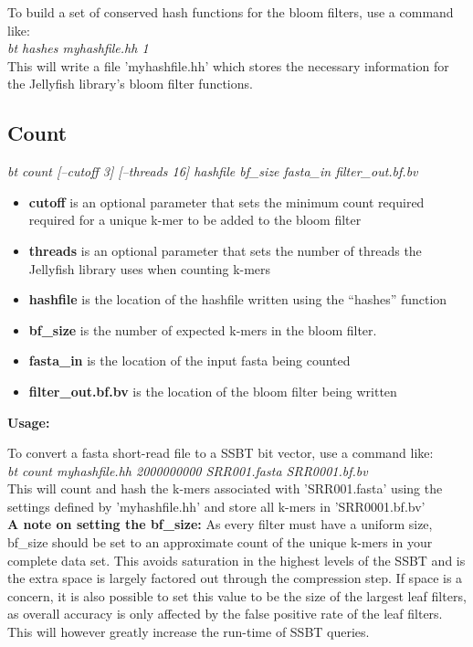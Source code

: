 \documentclass{article}
\begin{document}
To build a set of conserved hash functions for the bloom filters, use a command like: \\

\textit{bt hashes myhashfile.hh 1} \\

This will write a file 'myhashfile.hh' which stores the necessary information for the Jellyfish library's bloom filter functions.

\subsection{Count}
\textit{bt count [--cutoff 3] [--threads 16] hashfile bf\_size fasta\_in filter\_out.bf.bv}
\begin{itemize}
\item \textbf{cutoff} is an optional parameter that sets the minimum count required required for a unique k-mer to be added to the bloom filter
\item \textbf{threads} is an optional parameter that sets the number of threads the Jellyfish library uses when counting k-mers
\item \textbf{hashfile} is the location of the hashfile written using the ``hashes'' function
\item \textbf{bf\_size} is the number of expected k-mers in the bloom filter. 
\item \textbf{fasta\_in} is the location of the input fasta being counted
\item \textbf{filter\_out.bf.bv} is the location of the bloom filter being written
\end{itemize}
\textbf{Usage:}

To convert a fasta short-read file to a SSBT bit vector, use a command like: \\

\textit{bt count myhashfile.hh 2000000000 SRR001.fasta SRR0001.bf.bv} \\

This will count and hash the k-mers associated with 'SRR001.fasta' using the settings defined by 'myhashfile.hh' and store all k-mers in 'SRR0001.bf.bv' \\

\textbf{A note on setting the bf\_size:}
As every filter must have a uniform size, bf\_size should be set to an approximate count of the unique k-mers in your complete data set. This avoids saturation in the highest levels of the SSBT and is the extra space is largely factored out through the compression step. If space is a concern, it is also possible to set this value to be the size of the largest leaf filters, as overall accuracy is only affected by the false positive rate of the leaf filters. This will however greatly increase the run-time of SSBT queries. 
\end{document}
